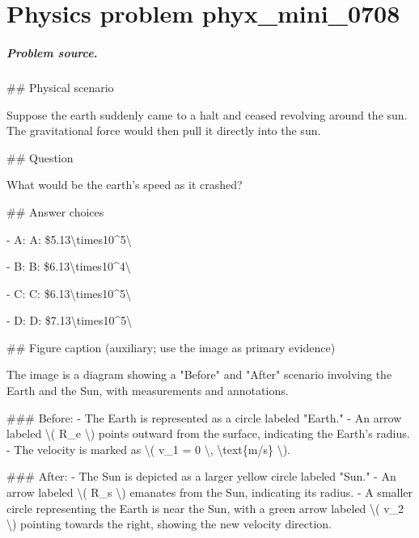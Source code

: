 
\chapter{Physics problem phyx\_mini\_0708}
\label{ch:PhyXMiniProblems_problem_phyx_mini_0708}

\paragraph{Problem source.}
\#\# Physical scenario

Suppose the earth suddenly came to a halt and ceased revolving around the sun. The gravitational force would then pull it directly into the sun.

\#\# Question

What would be the earth's speed as it crashed?

\#\# Answer choices

- A: A: \$5.13\textbackslash{}times10\textasciicircum{}5\textbackslash{}

- B: B: \$6.13\textbackslash{}times10\textasciicircum{}4\textbackslash{}

- C: C: \$6.13\textbackslash{}times10\textasciicircum{}5\textbackslash{}

- D: D: \$7.13\textbackslash{}times10\textasciicircum{}5\textbackslash{}

\#\# Figure caption (auxiliary; use the image as primary evidence)

The image is a diagram showing a "Before" and "After" scenario involving the Earth and the Sun, with measurements and annotations.

\#\#\# Before:
- The Earth is represented as a circle labeled "Earth."
- An arrow labeled \textbackslash{}( R\_e \textbackslash{}) points outward from the surface, indicating the Earth's radius.
- The velocity is marked as \textbackslash{}( v\_1 = 0 \textbackslash{}, \textbackslash{}text\{m/s\} \textbackslash{}).

\#\#\# After:
- The Sun is depicted as a larger yellow circle labeled "Sun."
- An arrow labeled \textbackslash{}( R\_s \textbackslash{}) emanates from the Sun, indicating its radius.
- A smaller circle representing the Earth is near the Sun, with a green arrow labeled \textbackslash{}( v\_2 \textbackslash{}) pointing towards the right, showing the new velocity direction.

